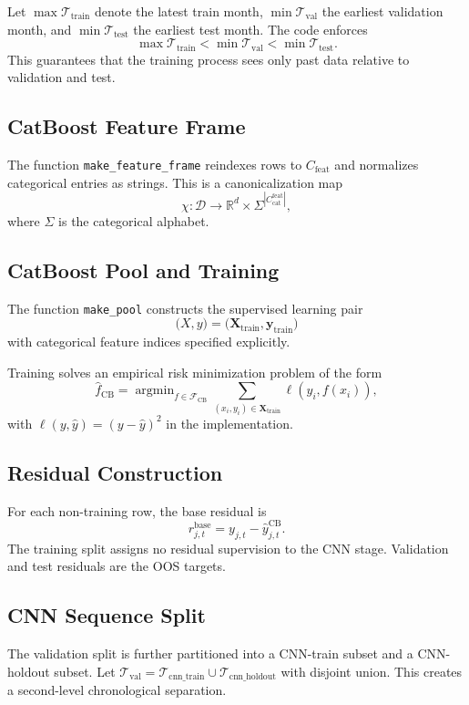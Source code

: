 \documentclass[11pt]{article}
\newcommand{\R}{\mathbb{R}}
\newcommand{\1}{\mathbf{1}}
\newcommand{\X}{\mathbf{X}}
\newcommand{\y}{\mathbf{y}}
\newcommand{\argmin}{\mathop{\mathrm{argmin}}}
\newcommand{\D}{\mathcal{D}}
\newcommand{\T}{\mathcal{T}}
\begin{document}
Let $\max \T_{\mathrm{train}}$ denote the latest train month, $\min \T_{\mathrm{val}}$ the earliest validation month, and $\min \T_{\mathrm{test}}$ the earliest test month. The code enforces
\[
\max \T_{\mathrm{train}} < \min \T_{\mathrm{val}} < \min \T_{\mathrm{test}}.
\]
This guarantees that the training process sees only past data relative to validation and test.

\subsection{CatBoost Feature Frame}

The function \texttt{make\_feature\_frame} reindexes rows to $C_{\mathrm{feat}}$ and normalizes categorical entries as strings. This is a canonicalization map
\[
\chi : \D \to \R^d \times \Sigma^{|C_{\mathrm{cat}}^{\mathrm{feat}}|},
\]
where $\Sigma$ is the categorical alphabet.

\subsection{CatBoost Pool and Training}

The function \texttt{make\_pool} constructs the supervised learning pair
\[
\big( X, y \big) = \big( \X_{\mathrm{train}}, \y_{\mathrm{train}} \big)
\]
with categorical feature indices specified explicitly.

Training solves an empirical risk minimization problem of the form
\[
\hat f_{\mathrm{CB}} = \argmin_{f \in \mathcal{F}_{\mathrm{CB}}} \sum_{(x_i,y_i) \in \X_{\mathrm{train}}} \ell(y_i, f(x_i)),
\]
with $\ell(y,\hat y) = (y-\hat y)^2$ in the implementation.

\subsection{Residual Construction}

For each non-training row, the base residual is
\[
r_{j,t}^{\mathrm{base}} = y_{j,t} - \hat y^{\mathrm{CB}}_{j,t}.
\]
The training split assigns no residual supervision to the CNN stage. Validation and test residuals are the OOS targets.

\subsection{CNN Sequence Split}

The validation split is further partitioned into a CNN-train subset and a CNN-holdout subset. Let $\T_{\mathrm{val}} = \T_{\mathrm{cnn\_train}} \cup \T_{\mathrm{cnn\_holdout}}$ with disjoint union. This creates a second-level chronological separation.
\end{document}
